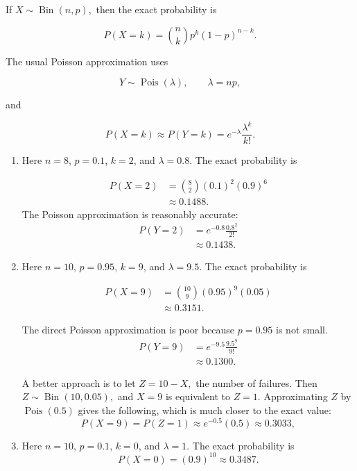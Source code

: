 \documentclass[11pt]{article}
\newenvironment{solution}{
    \par
    \begin{tcolorbox}[
        colback=white,
        colframe=uwgold,
        boxrule=0.7pt,
        arc=2mm,
        left=3mm,
        right=3mm,
        top=2mm,
        bottom=2mm,
        breakable,
        before skip=0.5em,
        after skip=1em,
        title=\textbf{Solution},
        coltitle=uwpurple,
        fonttitle=\bfseries
    ]
}{
    \end{tcolorbox}
}
\begin{document}
\begin{solution}

If $X\sim\operatorname{Bin}(n,p),
$ then the exact probability is

\[
P(X=k)=\binom nkp^k(1-p)^{n-k}.
\]

The usual Poisson approximation uses

\[
Y\sim\operatorname{Pois}(\lambda),
\qquad
\lambda=np,
\]

and

\[
P(X=k)\approx P(Y=k)
=
e^{-\lambda}\frac{\lambda^k}{k!}.
\]

\begin{enumerate}[label=(\alph*)]

\item Here \(n=8\), \(p=0.1\), \(k=2\), and \(\lambda=0.8\). The exact probability is

\[
\begin{aligned}
P(X=2)
&=
\binom82(0.1)^2(0.9)^6\\
&\approx
 {0.1488}.
\end{aligned}
\]
The Poisson approximation is reasonably accurate:
\[
\begin{aligned}
P(Y=2)
&=
e^{-0.8}\frac{0.8^2}{2!}\\
&\approx
 {0.1438}.
\end{aligned}
\]

\item Here \(n=10\), \(p=0.95\), \(k=9\), and \(\lambda=9.5\). The exact probability is

\[
\begin{aligned}
P(X=9)
&=
\binom{10}{9}(0.95)^9(0.05)\\
&\approx
 {0.3151}.
\end{aligned}
\]

The direct Poisson approximation is
poor because \(p=0.95\) is not small.
\[
\begin{aligned}
P(Y=9)
&=
e^{-9.5}\frac{9.5^9}{9!}\\
&\approx
 {0.1300}.
\end{aligned}
\]

 

A better approach is to let $Z=10-X,$ the number of failures. Then $Z\sim\operatorname{Bin}(10,0.05),
$ and \(X=9\) is equivalent to \(Z=1\). Approximating \(Z\) by
\(\operatorname{Pois}(0.5)\) gives the following, which is much closer to the exact value:
\[
P(X=9)
=
P(Z=1)
\approx
e^{-0.5}(0.5)
\approx0.3033,
\]

\item Here \(n=10\), \(p=0.1\), \(k=0\), and \(\lambda=1\). The exact probability is
\[
P(X=0)
=
(0.9)^{10}
\approx
 {0.3487}.
\]


\end{enumerate}
\end{solution}
\end{document}

